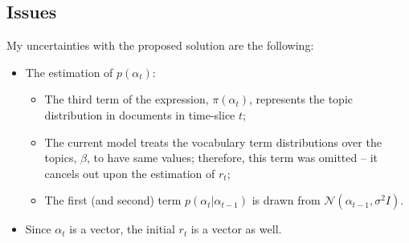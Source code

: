\documentclass[12pt]{article}
\begin{document}
\subsection*{Issues}
\par My uncertainties with the proposed solution are the following:
\begin{itemize}
\item The estimation of $p(\alpha_t)$:
\begin{itemize}
\item The third term of the expression, $\pi(\alpha_t)$, represents the topic distribution in documents in time-slice $t$;
\item The current model treats the vocabulary term distributions over the topics, $\beta$, to have same values; therefore, this term was omitted -- it cancels out upon the estimation of $r_t$;
\item The first (and second) term $p(\alpha_{t} | \alpha_{t-1})$ is drawn from $\mathcal{N}(\alpha_{t-1}, \sigma^2I)$.
\end{itemize}
\item Since $\alpha_t$ is a vector, the initial $r_t$ is a vector as well.
\end{itemize}


%
\end{document}
